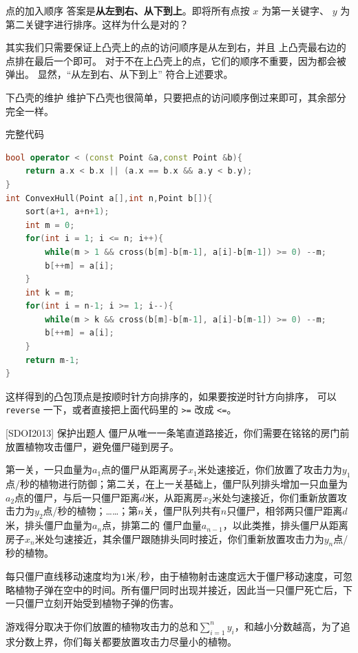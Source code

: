 \documentclass{beamer}
\begin{document}
\begin{frame}[fragile]{点的加入顺序}
    \small
    答案是\textbf{从左到右、从下到上}。即将所有点按 $x$ 为第一关键字、
    $y$ 为第二关键字进行排序。这样为什么是对的？
    \vspace{1em}\pause

    其实我们只需要保证上凸壳上的点的访问顺序是从左到右，并且
    上凸壳最右边的点排在最后一个即可。
    对于不在上凸壳上的点，它们的顺序不重要，因为都会被弹出。
    显然，“从左到右、从下到上” 符合上述要求。
\end{frame}

\begin{frame}[fragile]{下凸壳的维护}
    \small
    维护下凸壳也很简单，只要把点的访问顺序倒过来即可，其余部分完全一样。
\end{frame}

\begin{frame}[fragile]{完整代码}
    \small
    \begin{lstlisting}[language=c++]
bool operator < (const Point &a,const Point &b){
    return a.x < b.x || (a.x == b.x && a.y < b.y);
}
int ConvexHull(Point a[],int n,Point b[]){
    sort(a+1, a+n+1);
    int m = 0;
    for(int i = 1; i <= n; i++){
        while(m > 1 && cross(b[m]-b[m-1], a[i]-b[m-1]) >= 0) --m;
        b[++m] = a[i];
    }
    int k = m;
    for(int i = n-1; i >= 1; i--){
        while(m > k && cross(b[m]-b[m-1], a[i]-b[m-1]) >= 0) --m;
        b[++m] = a[i];
    }
    return m-1;
}
    \end{lstlisting}

    \vspace{1em}\pause
    这样得到的凸包顶点是按顺时针方向排序的，如果要按逆时针方向排序，
    可以 \verb|reverse| 一下，或者直接把上面代码里的 \verb|>=| 改成 \verb|<=|。
\end{frame}

\begin{frame}{[SDOI2013] 保护出题人}
\footnotesize
僵尸从唯一一条笔直道路接近，你们需要在铭铭的房门前放置植物攻击僵尸，避免僵尸碰到房子。
\vspace{1em}

第一关，一只血量为$a_1$点的僵尸从距离房子$x_1$米处速接近，你们放置了攻击力为$y_1$点/秒的植物进行防御；第二关，在上一关基础上，僵尸队列排头增加一只血量为$a_2$点的僵尸，与后一只僵尸距离$d$米，从距离房$x_2$米处匀速接近，你们重新放置攻击力为$y_2$点/秒的植物；……；第$n$关，僵尸队列共有$n$只僵尸，相邻两只僵尸距离$d$米，排头僵尸血量为$a_n$点，排第二的 僵尸血量$a_{n-1}$，以此类推，排头僵尸从距离房子$x_n$米处匀速接近，其余僵尸跟随排头同时接近，你们重新放置攻击力为$y_n$点/秒的植物。

\vspace{1em}
每只僵尸直线移动速度均为$1$米/秒，由于植物射击速度远大于僵尸移动速度，可忽略植物子弹在空中的时间。所有僵尸同时出现并接近，因此当一只僵尸死亡后，下一只僵尸立刻开始受到植物子弹的伤害。

\vspace{1em}
游戏得分取决于你们放置的植物攻击力的总和$\sum \limits _{i=1} ^{n} y_i$，和越小分数越高，为了追求分数上界，你们每关都要放置攻击力尽量小的植物。
\end{frame}
\end{document}
